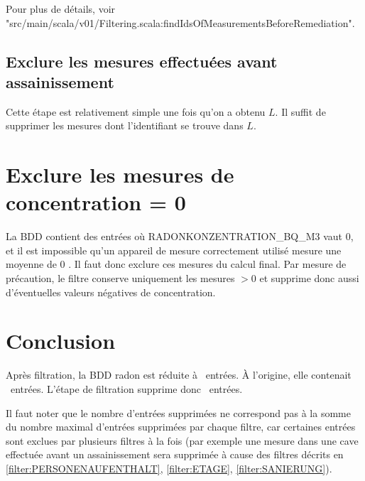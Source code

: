 Pour plus de détails, voir "src/main/scala/v01/Filtering.scala:findIdsOfMeasurementsBeforeRemediation".

\subsection{Exclure les mesures effectuées avant assainissement}
Cette étape est relativement simple une fois qu'on a obtenu $L$. Il suffit de supprimer les mesures dont l'identifiant se trouve dans $L$.


\section{Exclure les mesures de concentration = 0 \bqmc}
La BDD contient des entrées où RADONKONZENTRATION\_BQ\_M3 vaut 0, et il est impossible qu'un appareil de mesure correctement utilisé mesure une moyenne de 0 \bqmc. Il faut donc exclure ces mesures du calcul final. 
Par mesure de précaution, le filtre conserve uniquement les mesures $> 0$ \bqmc et supprime donc aussi d'éventuelles valeurs négatives de concentration.


\section{Conclusion}

Après filtration, la BDD radon est réduite à \nbEntreesApresFiltration\ entrées. À l'origine, elle contenait \nbEntreesAvantFiltration\ entrées. L'étape de filtration supprime donc \nbEntreesSupprParFiltration\ entrées.

Il faut noter que le nombre d'entrées supprimées ne correspond pas à la somme du nombre maximal d'entrées supprimées par chaque filtre, car certaines entrées sont exclues par plusieurs filtres à la fois (par exemple une mesure dans une cave effectuée avant un assainissement sera supprimée à cause des filtres décrits en \ref{filter:PERSONENAUFENTHALT}, \ref{filter:ETAGE}, \ref{filter:SANIERUNG}). 
